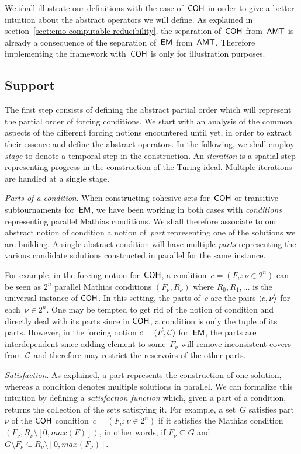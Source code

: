 We shall illustrate our definitions with the case of~$\operatorname{\sf{COH}}$ in order to give a better
intuition about the abstract operators we will define. As explained in section~\ref{sect:emo-computable-reducibility}, 
the separation of~$\operatorname{\sf{COH}}$ from~$\operatorname{\sf{AMT}}$
is already a consequence of the separation of~$\operatorname{\sf{EM}}$ from~$\operatorname{\sf{AMT}}$. Therefore implementing the framework
with~$\operatorname{\sf{COH}}$ is only for illustration purposes.

\subsection{Support}

The first step consists of defining the abstract partial order which will represent the partial
order of forcing conditions. We start with an analysis of the common aspects of the different
forcing notions encountered until yet, in order to extract their essence and define the abstract operators.
In the following, we shall employ \emph{stage} to denote a temporal step in the construction.
An \emph{iteration} is a spatial step representing progress in the construction of the Turing ideal.
Multiple iterations are handled at a single stage. 
\smallskip

\emph{Parts of a condition}. When constructing cohesive sets for~$\operatorname{\sf{COH}}$
or transitive subtournaments for~$\operatorname{\sf{EM}}$, we have been working in both cases with \emph{conditions}
representing parallel Mathias conditions. We shall therefore associate to our abstract notion of condition
a notion of~\emph{part} representing one of the solutions we are building.
A single abstract condition will have multiple \emph{parts} representing the various candidate
solutions constructed in parallel for the same instance.

For example, in the forcing notion for~$\operatorname{\sf{COH}}$, a condition~$c = (F_\nu : \nu \in 2^n)$
can be seen as $2^n$ parallel Mathias conditions $(F_\nu, R_\nu)$ where $R_0, R_1, \dots$
is the universal instance of $\operatorname{\sf{COH}}$. In this setting, the parts of~$c$ are the pairs $\left\langle c, \nu \right\rangle$ for each~$\nu \in 2^n$.
One may be tempted to get rid of the notion of condition and directly deal with its parts
since in $\operatorname{\sf{COH}}$, a condition is only the tuple of its parts.
However, in the forcing notion $c = (\vec{F}, \mathcal{C})$ for~$\operatorname{\sf{EM}}$, the parts are interdependent
since adding element to some~$F_\nu$ will remove inconsistent covers from~$\mathcal{C}$
and therefore may restrict the reservoirs of the other parts.
\smallskip

\emph{Satisfaction}. As explained, a part represents the construction of one solution, whereas a condition
denotes multiple solutions in parallel. We can formalize this intuition by defining
a \emph{satisfaction function} which, given a part of a condition, returns the collection of the sets
satisfying it. For example, a set~$G$ satisfies part~$\nu$ of the $\operatorname{\sf{COH}}$ condition~$c = (F_\nu : \nu \in 2^n)$
if it satisfies the Mathias condition $(F_\nu, R_\nu \setminus [0, max(F)])$,
in other words, if $F_\nu \subseteq G$ and $G \setminus F_\nu \subseteq R_\nu \setminus [0, max(F_\nu)]$.
\smallskip


